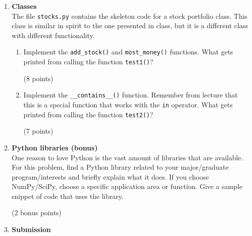 \documentclass{article}
\newcounter{points}
\newcounter{bonuspoints}
\newcommand\setpoints[1]{\addtocounter{points}{#1}(#1 points)}
\newcommand\setbonuspoints[1]{\addtocounter{bonuspoints}{#1}(#1 bonus points)}
\newcommand\printpoints{Total number of points: \value{\thepoints}}
\begin{document}
\begin{enumerate}
Finally, only compute $n$-grams that occur on a single line of the text (not $n$-grams that contain words from the end of one line and the beginning of the next line).  Therefore, you can follow the examples from lecture on reading a file line-by-line. \\

\textbf{Grading} \\
To grade this question, tests will be conducted by calling the functions you implement.  Each test is worth 0 points (do not pass test) or 1 point (pass test).  There are 25 total tests.

All of the tests used for grading are distributed with the assignment.  Gaming the autograder by hard-coding the answers of the provided test functions is considered cheating and a violation of the Stanford honor code.  I will be testing your code with additional (unreleased) tests to ensure that there is no cheating.

To run the autograder, simply do \texttt{python grader.py}.  See the documentation in \texttt{grader.py} for running individual tests.


\item \textbf{Classes} \\
The file \texttt{stocks.py} contains the skeleton code for a stock portfolio class.  This class is similar in spirit to the one presented in class, but it is a different class with different functionality.

\begin{enumerate}
\item Implement the \texttt{add\_stock()} and \texttt{most\_money()} functions.  What gets printed from calling the function \texttt{test1()}? \setpoints{8}
\end{enumerate}

\begin{enumerate}
\setcounter{enumii}{1}
\item Implement the \texttt{\_\_contains\_\_()} function.  Remember from lecture that this is a special function that works with the \texttt{in} operator.  What gets printed from calling the function \texttt{test2()}? \setpoints{7}
\end{enumerate}

\item \textbf{Python libraries (bonus)} \\
One reason to love Python is the vast amount of libraries that are available.  For this problem, find a Python library related to your major/graduate program/interests and briefly explain what it does.  If you choose NumPy/SciPy, choose a specific application area or function.  Give a sample snippet of code that uses the library.  \setbonuspoints {2} 


\item \textbf{Submission} \\

\end{enumerate}
\end{document}
